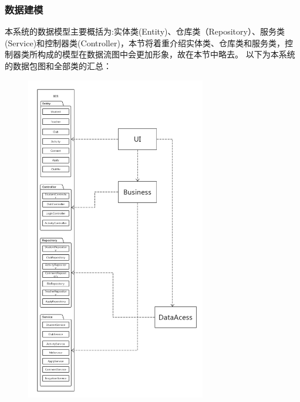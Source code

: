 \documentclass[UTF8]{ctexart}
\begin{document}
\subsubsection{数据建模}
本系统的数据模型主要概括为:实体类(Entity)、仓库类（Repository）、服务类(Service)和控制器类(Controller)，本节将着重介绍实体类、仓库类和服务类，控制器类所构成的模型在数据流图中会更加形象，故在本节中略去。
以下为本系统的数据包图和全部类的汇总：
\newline
\newline
\begin{figure}
\centering
\includegraphics[width = 0.7\textwidth]{package.png}
\end{figure}
\end{document}
